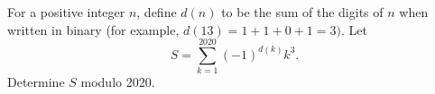 For a positive integer $n$, define $d(n)$ to be the sum of the digits of $n$ when written in binary (for example, $d(13) = 1+1+0+1=3)$. Let
\[
S = \sum_{k=1}^{2020} (-1)^{d(k)} k^3.
\]
Determine $S$ modulo 2020.
